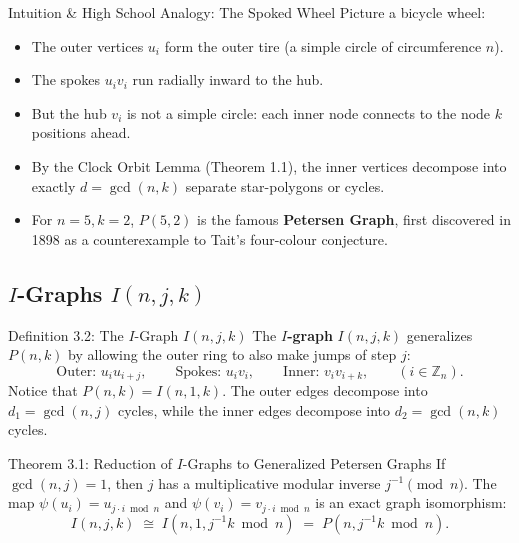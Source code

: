 \documentclass[11pt]{article}
\begin{document}
\begin{intubox}{Intuition \& High School Analogy: The Spoked Wheel}
Picture a bicycle wheel:
\begin{itemize}[leftmargin=*,nosep]
  \item The outer vertices $u_i$ form the outer tire (a simple circle of circumference $n$).
  \item The spokes $u_i v_i$ run radially inward to the hub.
  \item But the hub $v_i$ is not a simple circle: each inner node connects to the node $k$ positions ahead.
  \item By the Clock Orbit Lemma (Theorem 1.1), the inner vertices decompose into exactly $d = \gcd(n,k)$ separate star-polygons or cycles.
  \item For $n=5, k=2$, $P(5,2)$ is the famous \textbf{Petersen Graph}, first discovered in 1898 as a counterexample to Tait's four-colour conjecture.
\end{itemize}
\end{intubox}

\subsection{$I$-Graphs $I(n,j,k)$}

\begin{defbox}{Definition 3.2: The $I$-Graph $I(n,j,k)$}
The \textbf{$I$-graph} $I(n,j,k)$ generalizes $P(n,k)$ by allowing the outer ring to also make jumps of step $j$:
\begin{equation}
  \text{Outer: } u_i u_{i+j}, \qquad \text{Spokes: } u_i v_i, \qquad \text{Inner: } v_i v_{i+k}, \qquad (i \in \mathbb{Z}_n).
\end{equation}
Notice that $P(n,k) = I(n,1,k)$.
The outer edges decompose into $d_1 = \gcd(n,j)$ cycles, while the inner edges decompose into $d_2 = \gcd(n,k)$ cycles.
\end{defbox}

\begin{thmbox}{Theorem 3.1: Reduction of $I$-Graphs to Generalized Petersen Graphs}
If $\gcd(n, j) = 1$, then $j$ has a multiplicative modular inverse $j^{-1} \pmod n$. 
The map $\psi(u_i) = u_{j \cdot i \bmod n}$ and $\psi(v_i) = v_{j \cdot i \bmod n}$ is an exact graph isomorphism:
\begin{equation}
  I(n, j, k) \;\cong\; I(n, 1, j^{-1}k \bmod n) \;=\; P(n, j^{-1}k \bmod n).
\end{equation}
\end{thmbox}
\end{document}
